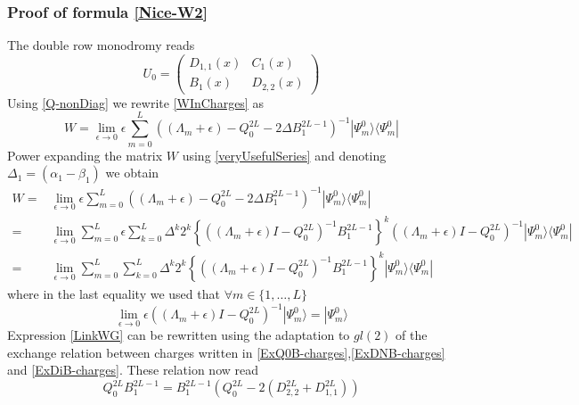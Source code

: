 \documentclass[10pt]{article}
\numberwithin{equation}{section}
\numberwithin{equation}{subsection}
\begin{document}
\subsubsection{Proof of formula \eqref{Nice-W2}}
The double row monodromy reads
\begin{equation}
	U_{0}=\begin{pmatrix}
		D_{1,1}(x)&C_{1}(x)\\
		B_{1}(x)&D_{2,2}(x)
	\end{pmatrix}
\end{equation}
Using \eqref{Q-nonDiag} we rewrite \eqref{WInCharges} as
\begin{equation}\label{W}
	W=\lim_{\epsilon\to 0}\epsilon\sum_{m=0}^{L}\left((\Lambda_{m}+\epsilon)-Q_{0}^{2L}-2\Delta B_{1}^{2L-1}\right)^{-1}|\Psi_{m}^{0}\rangle \langle \Psi_{m}^{0}|
\end{equation}
Power expanding the matrix $W$ using \eqref{veryUsefulSeries} and denoting $\Delta_{1}=(\alpha_{1}-\beta_{1})$ we obtain 
\begin{equation}\label{LinkWG}
	\begin{split}
		W=&\lim_{\epsilon\to 0}\epsilon\sum_{m=0}^{L}\left((\Lambda_{m}+\epsilon)-Q_{0}^{2L}-2\Delta B_{1}^{2L-1}\right)^{-1}|\Psi_{m}^{0}\rangle\langle \Psi_{m}^{0}|\\
		=&\lim_{\epsilon\to 0}\sum_{m=0}^{L}\epsilon\sum_{k=0}^{L}\Delta^{k}2^{k}\left\{\left((\Lambda_{m}+\epsilon)I-Q_{0}^{2L}\right)^{-1}B_{1}^{2L-1}\right\}^{k}\left((\Lambda_{m}+\epsilon)I-Q_{0}^{2L}\right)^{-1}|\Psi_{m}^{0}\rangle\langle \Psi_{m}^{0}|
		\\=&
		\lim_{\epsilon\to0}\sum_{m=0}^{L}\sum_{k=0}^{L}\Delta^{k}2^{k}\left\{\left((\Lambda_{m}+\epsilon)I-Q_{0}^{2L}\right)^{-1}B_{1}^{2L-1}\right\}^{k}|\Psi_{m}^{0}\rangle\langle \Psi_{m}^{0}|
	\end{split}
\end{equation}
where in the last equality we used that $\forall m\in \{1,\ldots,L\}$
\begin{equation}
	\lim_{\epsilon\to 0}\epsilon\left((\Lambda_{m}+\epsilon)I-Q_{0}^{2L}\right)^{-1}|\Psi_{m}^{0}\rangle=|\Psi_{m}^{0}\rangle
\end{equation}
Expression \eqref{LinkWG} can be rewritten using the adaptation to $gl(2)$ of the exchange relation between charges written in \eqref{ExQ0B-charges},\eqref{ExDNB-charges} and \eqref{ExDiB-charges}. These relation now read
\begin{equation}\label{exchangeQ0B}
	Q_{0}^{2L}B_{1}^{2L-1}=B_{1}^{2L-1}\left(Q_{0}^{2L}-2\left(D_{2,2}^{2L}+D_{1,1}^{2L}\right)\right)
\end{equation}
\end{document}
